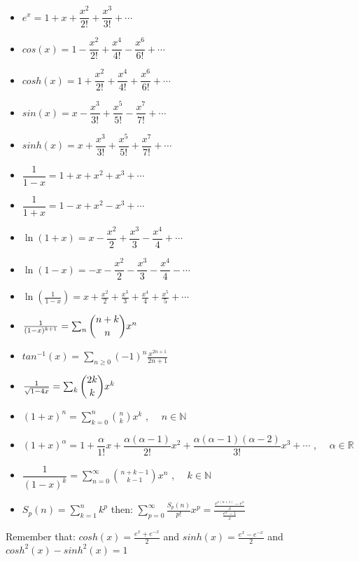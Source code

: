 {\normalsize
    \begin{itemize}
    	\item $e^x = 1 + x + \dfrac{x^2}{2!} + \dfrac{x^3}{3!} + \cdots$
    	\item $cos(x) = 1 - \dfrac{x^2}{2!} + \dfrac{x^4}{4!} - \dfrac{x^6}{6!} + \cdots$
    	\item $cosh(x) = 1 + \dfrac{x^2}{2!} + \dfrac{x^4}{4!} + \dfrac{x^6}{6!} + \cdots$
    	\item $sin(x) = x - \dfrac{x^3}{3!} + \dfrac{x^5}{5!} - \dfrac{x^7}{7!} + \cdots$
    	\item $sinh(x) = x + \dfrac{x^3}{3!} + \dfrac{x^5}{5!} + \dfrac{x^7}{7!} + \cdots$
    	\item $\dfrac{1}{1-x} = 1 + x + x^2 + x^3 + \cdots$
    	\item $\dfrac{1}{1+x} = 1 - x + x^2 - x^3 + \cdots$
    	\item $\ln(1+x) = x - \dfrac{x^2}{2} + \dfrac{x^3}{3} - \dfrac{x^4}{4} + \cdots$
    	\item $\ln(1-x) = -x - \dfrac{x^2}{2} - \dfrac{x^3}{3} - \dfrac{x^4}{4} - \cdots$
    	\item $\ln(\frac{1}{1-x}) = x + \frac{x^2}{2} + \frac{x^3}{3} + \frac{x^4}{4} + \frac{x^5}{5} + \cdots$
    	\item $\frac{1}{(1-x)^{k+1}} = \sum_n \dbinom{n+k}{n} x^n$
    	\item $tan^{-1}(x) = \sum_{n \geq 0} (-1)^n \frac{x^{2n+1}}{2n+1}$
    	\item $\frac{1}{\sqrt{1-4x}} = \sum_{k} \dbinom{2k}{k} x^k$
    	\item $\displaystyle (1+x)^n = \sum_{k=0}^{n} \binom{n}{k} x^k$ , $\quad n \in \mathbb{N}$
    	\item $\displaystyle (1+x)^\alpha = 1 + \dfrac{\alpha}{1!} x + \dfrac{\alpha(\alpha-1)}{2!} x^2 + \dfrac{\alpha(\alpha-1)(\alpha-2)}{3!} x^3 + \cdots$ , $\quad \alpha \in \mathbb{R}$
    	\item $\displaystyle \dfrac{1}{(1-x)^k} = \sum_{n=0}^{\infty} \binom{n+k-1}{k-1} x^n$ , $\quad k \in \mathbb{N}$
    	\item $\displaystyle S_p(n) = \sum_{k=1}^n k^p$ then: $\displaystyle \sum_{p=0}^\infty \frac{S_p(n)}{p!}x^p = \frac{ \frac{e^{x(n+1)} - e^x}{x} }{\frac{e^x-1}{x}}$
    \end{itemize} 


	Remember that: $cosh(x) = \frac{e^x + e^{-x}}{2}$ and $sinh(x) = \frac{e^x - e^{-x}}{2}$ and $cosh^2(x) - sinh^2(x) = 1$
}
